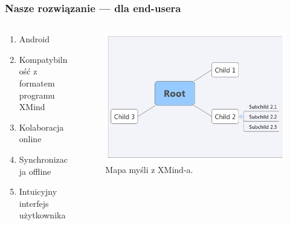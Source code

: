 \begin{frame}
\frametitle{Nasze rozwiązanie --- dla end-usera}

\begin{columns}[c]
	\begin{column}{.45\textwidth}
		\begin{enumerate}
 \item Android
 \item Kompatybilność z formatem programu XMind 
 \item Kolaboracja online 
 \item Synchronizacja offline 
 \item Intuicyjny interfejs użytkownika 
		\end{enumerate}
	\end{column}
	\begin{column}{.45\textwidth}
		\begin{figure}
			\includegraphics[width=\textwidth]{xmind}
			\caption{Mapa myśli z XMind-a.}
		\end{figure}
	\end{column}
\end{columns}



\end{frame}
